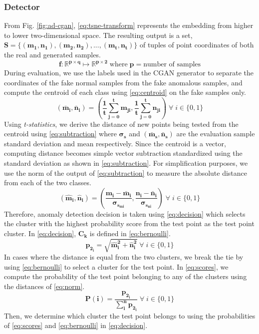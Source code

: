 \subsubsection{Detector}
\label{subsub:detector} 
From Fig. \ref{fig:ad-cgan}, \eqref{eq:tsne-transform} represents the embedding from higher to lower two-dimensional space. The resulting output is a set, $ { \bm{S=\{(m_1,n_1),(m_2,n_2),...,(m_t,n_t)\}}} $ of tuples of point coordinates of both the real and generated samples. 
\begin{equation}
\label{eq:tsne-transform}
\bm{f:\mathbb{R}^{p\times q}\longmapsto\mathbb{R}^{p\times 2}}\; \text{where}\; \bm{p=} \text{number of samples}
\end{equation}
During evaluation, we use the labels used in the CGAN generator to separate the coordinates of the fake normal samples from the fake anomalous samples, and compute the centroid of each class using \eqref{eq:centroid} on the fake samples only. 
\begin{equation}
	\label{eq:centroid}
	\bm{\left(\bar{m}_i,\bar{n}_i\right)}=\bm{\left( \frac{1}{t}\sum_{j=0}^{t}m_{ji},\frac{1}{t}\sum_{j=0}^{t}n_{ji}\right)} \; \forall\; i\in \{0,1\}
\end{equation}
Using \textit{t-statistics}, we derive the distance of new points being tested from the centroid using \eqref{eq:subtraction} where $ \bm{\sigma_{s}} $ and $ \bm{\left(\bar{m}_s,\bar{n}_s\right)} $ are the evaluation sample standard deviation and mean respectively. Since the centroid is a vector, computing distance becomes simple vector subtraction standardized using the standard deviation as shown in \eqref{eq:subtraction}. For simplification purposes, we use the norm of the output of \eqref{eq:subtraction} to measure the absolute distance from each of the two classes.
\begin{equation}
	\label{eq:subtraction}
	\bm{\left( \hat{m}_i,\hat{n}_i \right)}= \bm{\left( \frac{m_i-\bar{m}_i}{\sigma_{s_{mi}}}, \frac{n_i-\bar{n}_i}{\sigma_{s_{ni}}} \right)} \; \forall\; i\in \{0,1\}
\end{equation}
Therefore, anomaly detection decision is taken using \eqref{eq:decision} which selects the cluster with the highest probability score from the test point as the test point cluster. In \eqref{eq:decision}, $ \bm{C_k} $ is defined in \eqref{eq:bernoulli}. 
\begin{equation}
\bm{p_{2_i}}=\bm{\sqrt{\hat{m}_{i}^2+\hat{n}_{i}^2}} \; \forall\; i\in \{0,1\}
\label{eq:norm}
\end{equation}
In cases where the distance is equal from the two clusters, we break the tie by using \eqref{eq:bernoulli} to select a cluster for the test point. In \eqref{eq:scores}, we compute the probability of the test point belonging to any of the clusters using the distances of \eqref{eq:norm}. 
\begin{equation}
\label{eq:scores}
\bm{P(i) = \frac{p_{2_i}}{\sum_{i}^{n}p_{2_i}}}\; \forall\; i\in \{0,1\}
\end{equation}
Then, we determine which cluster the test point belongs to using the probabilities of \eqref{eq:scores} and \eqref{eq:bernoulli} in \eqref{eq:decision}.


